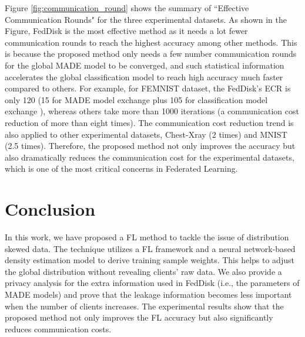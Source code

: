 \documentclass[mathfont=newtx]{uai2023} %
\newcommand{\MethodnameShort}{FedDisk}
\begin{document}
Figure \ref{fig:communication_round} shows the summary of ``Effective Communication Rounds" for the three experimental datasets. As shown in the Figure, \MethodnameShort{} is the most effective method as it needs a lot fewer communication rounds to reach the highest accuracy among other methods. This is because the proposed method only needs a few number communication rounds for the global MADE model to be converged, and such statistical information accelerates the global classification model to reach high accuracy much faster compared to others. For example, for FEMNIST dataset, the \MethodnameShort{}'s ECR is only 120 (15 for MADE model exchange plus 105 for classification model exchange ), whereas others take more than 1000 iterations (a communication cost reduction of more than eight times). The communication cost reduction trend is also applied to other experimental datasets, Chest-Xray (2 times) and MNIST (2.5 times). Therefore, the proposed method not only improves the accuracy but also dramatically reduces the communication cost for the experimental datasets, which is one of the most critical concerns in Federated Learning.

      
\section{Conclusion}
\label{sec:conclusion}
In this work, we have proposed a FL method to tackle the issue of distribution skewed data. The technique utilizes a FL framework and a neural network-based density estimation model to derive training sample weights. This helps to adjust the global distribution without revealing clients' raw data. We also provide a privacy analysis for the extra information used in \MethodnameShort{} (i.e., the parameters of MADE models) and prove that the leakage information becomes less important when the number of clients increases. The experimental results show that the proposed method not only improves the FL accuracy but also significantly reduces communication costs. 

\balance




\end{document}
